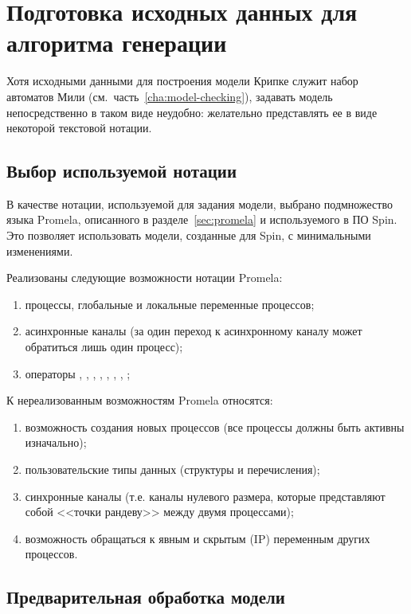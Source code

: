 \chapter{Подготовка исходных данных для алгоритма генерации}
\label{cha:code-gen}

Хотя исходными данными для построения модели Крипке служит набор автоматов Мили
(см.~часть~\ref{cha:model-checking}), задавать модель непосредственно в таком виде
неудобно: желательно представлять ее в виде некоторой текстовой нотации.

\section{Выбор используемой нотации}
\label{sec:notation-choice}

В качестве нотации, используемой для задания модели, выбрано подмножество языка Promela,
описанного в разделе~\ref{sec:promela} и используемого в ПО Spin. Это позволяет
использовать модели, созданные для Spin, с минимальными изменениями.

Реализованы следующие возможности нотации Promela:
\begin{enumerate}
\item процессы, глобальные и локальные переменные процессов;
\item асинхронные каналы (за один переход к асинхронному каналу может обратиться лишь
  один процесс);
\item операторы , , , , ,
  , , ;
\end{enumerate}

К нереализованным возможностям Promela относятся:
\begin{enumerate}
\item возможность создания новых процессов (все процессы должны быть активны изначально);
\item пользовательские типы данных (структуры и перечисления);
\item синхронные каналы (т.е. каналы нулевого размера, которые представляют собой <<точки
  рандеву>> между двумя процессами);
\item возможность обращаться к явным и скрытым (IP) переменным других процессов.
\end{enumerate}

\section{Предварительная обработка модели}
\label{sec:idef0-codegen}


